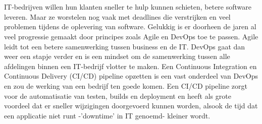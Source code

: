
\chapter{}
\label{ch:inleiding}

IT-bedrijven willen hun klanten sneller te hulp kunnen schieten, betere software leveren. Maar ze worstelen nog vaak met deadlines die verstrijken en veel problemen tijdens de oplevering van software. Gelukkig is er doorheen de jaren al veel progressie gemaakt door principes zoals Agile en DevOps toe te passen. Agile leidt tot een betere samenwerking tussen business en de IT. DevOps gaat dan weer een stapje verder en is een mindset om de samenwerking tussen alle afdelingen binnen een IT-bedrijf vlotter te maken. 
Een Continuous Integration en Continuous Delivery (CI/CD) pipeline opzetten is een vast onderdeel van DevOps en zou de werking van een bedrijf ten goede komen. Een CI/CD pipeline zorgt voor de automatisatie van testen, builds en deployment en heeft als grote voordeel dat er sneller wijzigingen doorgevoerd kunnen worden, alsook de tijd dat een applicatie niet runt -'downtime' in IT genoemd- kleiner wordt.

